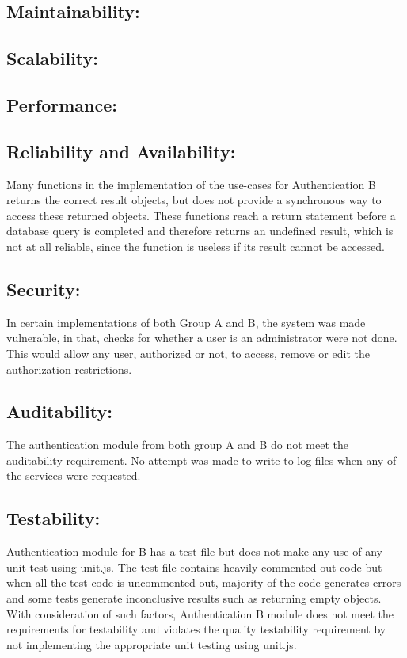\subsection{Maintainability:}

\subsection{Scalability:}

\subsection{Performance:}

\subsection{Reliability and Availability:}
Many functions in the implementation of the use-cases for Authentication B returns the correct result objects, but does not provide a synchronous way to access these returned objects. These functions reach a return statement before a database query is completed and therefore returns an undefined result, which is not at all reliable, since the function is useless if its result cannot be accessed.

\subsection{Security:}
In certain implementations of both  Group A and B, the system was made vulnerable, in that, checks for whether a user is an administrator were not done. This would allow any user, authorized or not, to access, remove or edit the authorization restrictions.

\subsection{Auditability:}
The authentication module from both group A and B do not meet the auditability requirement. No attempt was made to write to log files when any of the services were requested.

\subsection{Testability:}
Authentication module for B has a test file but does not make any use of any unit test using unit.js. The test file contains heavily commented out code but when all the test code is uncommented out, majority of the code generates errors and some tests generate inconclusive results such as returning empty objects. With consideration of such factors, Authentication B module does not meet the requirements for testability and violates the quality testability requirement by not implementing the appropriate unit testing using unit.js.

